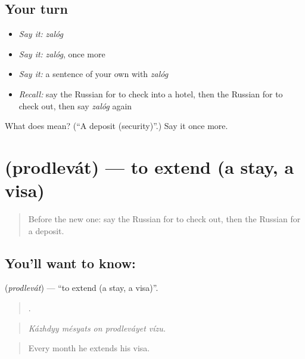 \subsection*{Your turn}
\begin{itemize}
\raggedright
  \item \emph{Say it:} \emph{zalóg}
  \item \emph{Say it:} \emph{zalóg}, once more
  \item \emph{Say it:} a sentence of your own with \emph{zalóg}
  \item \emph{Recall:} say the Russian for to check into a hotel, then the Russian for to check out, then say \emph{zalóg} again
\end{itemize}

\begin{tcolorbox}[breakable,colback=teal!4,colframe=teal!35!black,title={Before you move on}]
What does  mean? (\textquotedblleft{}A deposit (security)\textquotedblright{}.) Say it once more.
\end{tcolorbox}
\section[\texorpdfstring{\ru{продлевать} (prodlevát)}{продлевать (prodlevát)}]{ (prodlevát) — to extend (a stay, a visa)}

\label{lesson:RU-C429-prodlevat}



\begin{quote}
Before the new one: say the Russian for to check out, then the Russian for a deposit.
\end{quote}

\subsection*{You'll want to know: }
\textbf{} (\emph{prodlevát}) — \textquotedblleft{}to extend (a stay, a visa)\textquotedblright{}.

\begin{quote}
    .
\end{quote}

\begin{quote}
\emph{Kázhdyy mésyats on prodleváyet vízu.}
\end{quote}

\begin{quote}
Every month he extends his visa.
\end{quote}

